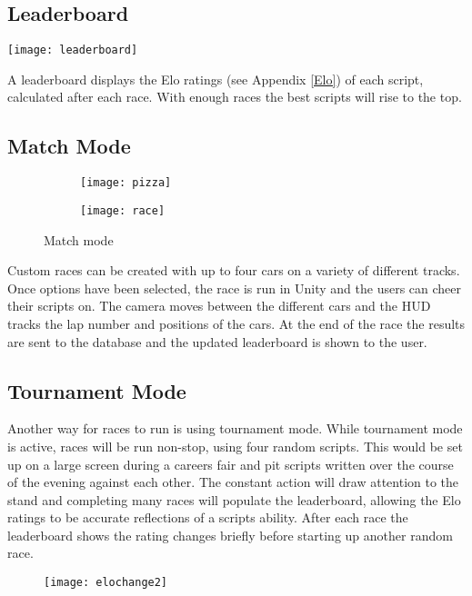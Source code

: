 \subsection{Leaderboard}
\centerline{\texttt{[image: leaderboard]}}
A leaderboard displays the Elo ratings (see Appendix \ref{Elo}) of each script, calculated after each race. With enough races the best scripts will rise to the top.

\subsection{Match Mode}

\begin{figure}[H]
\centering
\begin{subfigure}{.5\textwidth}
  \centering
\centerline{\texttt{[image: pizza]}}
  \label{fig:sub1}
\end{subfigure}%
\begin{subfigure}{.5\textwidth}
  \centering
\centerline{\texttt{[image: race]}}
  \label{fig:sub2}
\end{subfigure}
\label{fig:unityvsjava}
\caption{Match mode}
\end{figure}

Custom races can be created with up to four cars on a variety of different tracks. Once options have been selected, the race is run in Unity and the users can cheer their scripts on. The camera moves between the different cars and the HUD tracks the lap number and positions of the cars. At the end of the race the results are sent to the database and the updated leaderboard is shown to the user.

\subsection{Tournament Mode}
Another way for races to run is using tournament mode. While tournament mode is active, races will be run non-stop, using four random scripts. This would be set up on a large screen during a careers fair and pit scripts written over the course of the evening against each other. The constant action will draw attention to the stand and completing many races will populate the leaderboard, allowing the Elo ratings to be accurate reflections of a scripts ability. After each race the leaderboard shows the rating changes briefly before starting up another random race.
\begin{figure}[H]
\texttt{[image: elochange2]}
\end{figure}